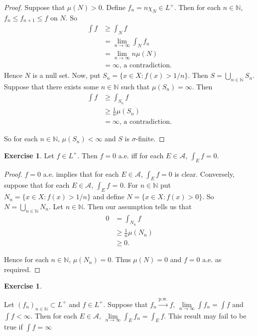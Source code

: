 \documentclass{book}
\theoremstyle{definition}
\newtheorem{ex}[definition]{Exercise}
\newcommand{\sig}{\sigma}
\newcommand{\N}{\mathbb{N}}
\newcommand{\MA}{\mathcal{A}}
\newcommand{\lex}[1]{\label{ex:#1}}
\DeclareMathOperator*{\0}{\mbf{0}}
\DeclareMathOperator*{\1}{\mbf{1}}
\begin{document}
	\begin{proof}
		Suppose that $\mu(N) > 0$. Define $f_n = n \chi_{N} \in L^+$. Then for each $n \in \N$, $f_n \leq f_{n+1} \leq f$ on $N$. So 
		\begin{align*}
			\int f 
			&\geq \int_N f\\ 
			&= \lim\limits_{n \rightarrow \infty} \int_N f_n\\ 
			&= \lim\limits_{n \rightarrow \infty} n\mu(N)\\
			&= \infty \text{, a contradiction.}
		\end{align*}
		Hence $N$ is a null set. Now, put $S_n = \{x \in X: f(x)>1/n\}$. Then $S = \bigcup \limits_{n \in \N}S_n$. Suppose that there exists some $n \in \N$ such that $\mu(S_n) = \infty$. Then 
		\begin{align*}
			\int f 
			&\geq \int_{S_n} f \\
			&\geq \frac{1}{n}\mu(S_n) \\
			&= \infty \text{, a contradiction.}
		\end{align*}
		
		So for each $n \in \N$, $\mu(S_n) < \infty$ and $S$ is $\sig$-finite.
		
	\end{proof}
	
	\begin{ex} \lex{00000} 
		Let $f \in L^+$. Then $f =0$ a.e. iff for each $E \in \MA$, $\int_E f =0$.
	\end{ex}
	
	\begin{proof}
		$f = 0$ a.e. implies that for each $E \in \MA$, $\int_E f =0$ is clear. Conversely, suppose that for each $E \in \MA$, $\int_E f$ = 0. For $n \in \N$ put $N_n = \{x \in X: f(x) > 1/n\}$ and define $N = \{x \in X: f(x)>0\}$. So $N = \bigcup\limits_{n \in \N} N_n$. Let $n \in \N$. Then our assumption tells us that 
		\begin{align*}
			0 
			&= \int_{N_n} f \\
			& \geq \frac{1}{n}\mu(N_n)\\
			& \geq 0.
		\end{align*} 
		
		Hence for each $n \in \N$, $\mu(N_n) = 0$. Thus $\mu(N) = 0$ and $f =0$ a.e. as required.
		
	\end{proof}
	
	\begin{ex} \lex{00000} 
		
		Let $(f_n)_{n \in \N} \subset L^+$ and $f \in L^+$. Suppose that $f_n \xrightarrow{\text{p.w.}} f$, $\lim \limits_{n \rightarrow \infty} \int f_n = \int f$ and $\int f < \infty$. Then for each $E \in \MA$, $\lim \limits_{n \rightarrow \infty} \int_E f_n = \int_E f$. This result may fail to be true if $\int f = \infty$
		
	\end{ex}
	
\end{document}
